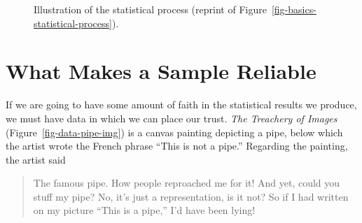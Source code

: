 \documentclass[
  letterpaper,
  DIV=11,
  numbers=noendperiod]{scrreprt}
\theoremstyle{definition}
\theoremstyle{definition}
\theoremstyle{plain}
\theoremstyle{remark}
\begin{document}
\begin{figure}


\caption{\label{fig-data-statistical-process}Illustration of the
statistical process (reprint of
Figure~\ref{fig-basics-statistical-process}).}

\end{figure}%

\section{What Makes a Sample
Reliable}\label{what-makes-a-sample-reliable}

If we are going to have some amount of faith in the statistical results
we produce, we must have data in which we can place our trust. \emph{The
Treachery of Images} (Figure~\ref{fig-data-pipe-img}) is a canvas
painting depicting a pipe, below which the artist wrote the French
phrase ``This is not a pipe.'' Regarding the painting, the artist said

\begin{quote}
The famous pipe. How people reproached me for it! And yet, could you
stuff my pipe? No, it's just a representation, is it not? So if I had
written on my picture ``This is a pipe,'' I'd have been lying!
\end{quote}
\end{document}
